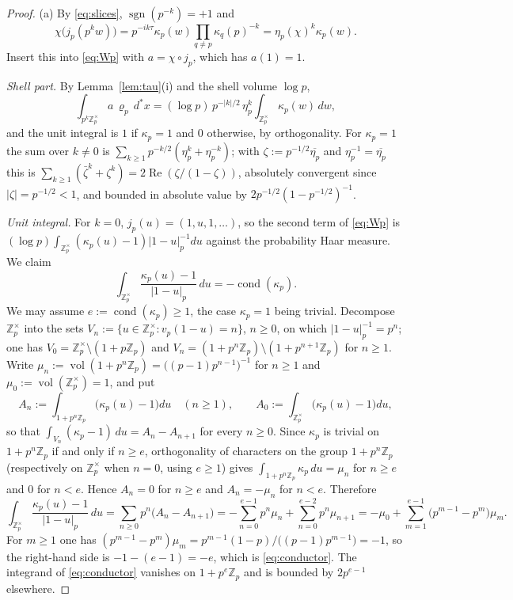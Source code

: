 \documentclass[11pt]{amsart}
\theoremstyle{definition}
\theoremstyle{remark}
\newcommand{\Z}{\mathbb Z}
\newcommand{\dstar}{\,d^{*}}
\newcommand{\Rel}{\operatorname{Re}}
\newcommand{\vol}{\operatorname{vol}}
\newcommand{\sgn}{\operatorname{sgn}}
\newcommand{\cond}{\operatorname{cond}}
\begin{document}
\begin{proof}
(a)  By \eqref{eq:slices}, $\sgn(p^{-k})=+1$ and
\[
\chi\bigl(j_p(p^{k}w)\bigr)=p^{-ik\tau}\kappa_p(w)\prod_{q\ne p}\kappa_q(p)^{-k}
=\eta_p(\chi)^{k}\kappa_p(w).
\]
Insert this into \eqref{eq:Wp} with $a=\chi\circ j_p$, which has $a(1)=1$.

\emph{Shell part.}  By Lemma~\ref{lem:tau}(i) and the shell volume $\log p$,
\[
\int_{p^{k}\Z_p^{\times}}a\,\varrho_p\dstar x
=(\log p)\,p^{-|k|/2}\,\eta_p^{k}\int_{\Z_p^{\times}}\kappa_p(w)\,dw ,
\]
and the unit integral is $1$ if $\kappa_p=1$ and $0$ otherwise, by
orthogonality.  For $\kappa_p=1$ the sum over
$k\ne0$ is $\sum_{k\ge1}p^{-k/2}(\eta_p^{k}+\eta_p^{-k})$; with
$\zeta:=p^{-1/2}\overline{\eta_p}$ and $\eta_p^{-1}=\overline{\eta_p}$ this is
$\sum_{k\ge1}(\bar\zeta^{k}+\zeta^{k})=2\Rel(\zeta/(1-\zeta))$, absolutely
convergent since $|\zeta|=p^{-1/2}<1$, and bounded in absolute value by
$2p^{-1/2}(1-p^{-1/2})^{-1}$.

\emph{Unit integral.}  For $k=0$, $j_p(u)=(1,u,1,\dots)$, so the second term
of \eqref{eq:Wp} is
$(\log p)\int_{\Z_p^{\times}}(\kappa_p(u)-1)|1-u|_p^{-1}du$ against the
probability Haar measure.  We claim
\begin{equation}\label{eq:conductor}
\int_{\Z_p^{\times}}\frac{\kappa_p(u)-1}{|1-u|_p}\,du=-\cond(\kappa_p).
\end{equation}
We may assume $e:=\cond(\kappa_p)\ge1$, the case $\kappa_p=1$ being
trivial.  Decompose $\Z_p^{\times}$ into the sets
$V_n:=\{u\in\Z_p^{\times}:v_p(1-u)=n\}$, $n\ge0$, on which $|1-u|_p^{-1}=p^{n}$;
one has $V_0=\Z_p^{\times}\setminus(1+p\Z_p)$ and
$V_n=(1+p^{n}\Z_p)\setminus(1+p^{n+1}\Z_p)$ for $n\ge1$.  Write
$\mu_n:=\vol(1+p^{n}\Z_p)=\bigl((p-1)p^{n-1}\bigr)^{-1}$ for $n\ge1$ and
$\mu_0:=\vol(\Z_p^{\times})=1$, and put
\[
A_n:=\int_{1+p^{n}\Z_p}\bigl(\kappa_p(u)-1\bigr)du\quad(n\ge1),\qquad
A_0:=\int_{\Z_p^{\times}}\bigl(\kappa_p(u)-1\bigr)du,
\]
so that $\int_{V_n}(\kappa_p-1)\,du=A_n-A_{n+1}$ for every $n\ge0$.  Since
$\kappa_p$ is trivial on $1+p^{n}\Z_p$ if and only if $n\ge e$, orthogonality
of characters on the group $1+p^{n}\Z_p$ (respectively on $\Z_p^{\times}$ when
$n=0$, using $e\ge1$) gives $\int_{1+p^n\Z_p}\kappa_p\,du=\mu_n$ for $n\ge e$
and $0$ for $n<e$.  Hence $A_n=0$ for $n\ge e$ and $A_n=-\mu_n$ for $n<e$.
Therefore
\[
\int_{\Z_p^{\times}}\frac{\kappa_p(u)-1}{|1-u|_p}\,du
=\sum_{n\ge0}p^{n}\bigl(A_n-A_{n+1}\bigr)
=-\sum_{n=0}^{e-1}p^{n}\mu_n+\sum_{n=0}^{e-2}p^{n}\mu_{n+1}
=-\mu_0+\sum_{m=1}^{e-1}\bigl(p^{m-1}-p^{m}\bigr)\mu_m .
\]
For $m\ge1$ one has $(p^{m-1}-p^{m})\mu_m=p^{m-1}(1-p)/\bigl((p-1)p^{m-1}\bigr)
=-1$, so the right-hand side is $-1-(e-1)=-e$, which is \eqref{eq:conductor}.
The integrand of \eqref{eq:conductor} vanishes on $1+p^{e}\Z_p$ and is bounded
by $2p^{e-1}$ elsewhere.


\end{proof}
\end{document}
